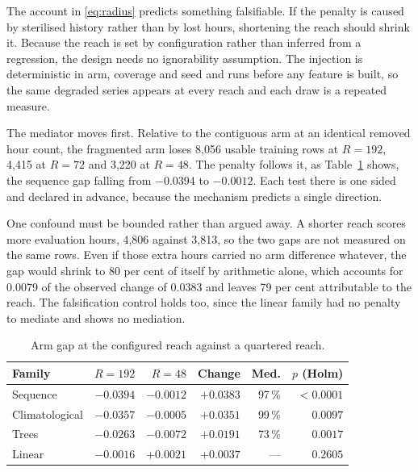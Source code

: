 \documentclass[conference]{IEEEtran}
\begin{document}
The account in \eqref{eq:radius} predicts something falsifiable. If the penalty is caused by
sterilised history rather than by lost hours, shortening the reach should shrink it. Because
the reach is set by configuration rather than inferred from a regression, the design needs no
ignorability assumption. The injection is deterministic in arm, coverage and seed and runs
before any feature is built, so the same degraded series appears at every reach and each draw is
a repeated measure.

The mediator moves first. Relative to the contiguous arm at an identical removed hour count,
the fragmented arm loses 8{,}056 usable training rows at $R=192$, 4{,}415 at $R=72$ and
3{,}220 at $R=48$. The penalty follows it, as Table~\ref{tab:mediation} shows, the sequence
gap falling from $-0.0394$ to $-0.0012$. Each test there is one sided and declared in advance,
because the mechanism predicts a single direction.

One confound must be bounded rather than argued away. A shorter reach scores more evaluation
hours, 4{,}806 against 3{,}813, so the two gaps are not measured on the same rows. Even if those
extra hours carried no arm difference whatever, the gap would shrink to 80 per cent of itself by
arithmetic alone, which accounts for 0.0079 of the observed change of 0.0383 and leaves 79 per
cent attributable to the reach. The falsification control holds too, since the linear family had
no penalty to mediate and shows no mediation.

\begin{table}[!t]
\caption{Arm gap at the configured reach against a quartered reach.}
\label{tab:mediation}
\centering
\footnotesize
\setlength{\tabcolsep}{3.5pt}
\begin{tabular}{l r r r r r}
\toprule
\textbf{Family} & \textbf{$R{=}192$} & \textbf{$R{=}48$} & \textbf{Change} & \textbf{Med.} & \textbf{$p$ (Holm)} \\
\midrule
Sequence       & $-0.0394$ & $-0.0012$ & $+0.0383$ & 97\,\% & $<0.0001$ \\
\midrule
Climatological & $-0.0357$ & $-0.0005$ & $+0.0351$ & 99\,\% & $0.0097$ \\
\midrule
Trees          & $-0.0263$ & $-0.0072$ & $+0.0191$ & 73\,\% & $0.0017$ \\
\midrule
Linear         & $-0.0016$ & $+0.0021$ & $+0.0037$ & ---    & $0.2605$ \\
\bottomrule
\end{tabular}
\end{table}
\end{document}
